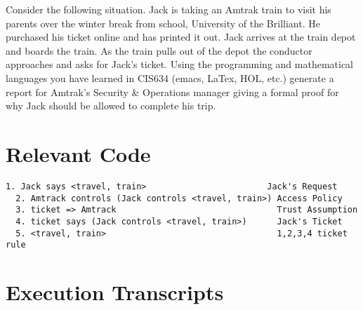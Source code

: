 \documentclass{report}
\begin{document}
Consider the following situation. Jack is taking an Amtrak train to visit his parents over the
winter break from school, University of the Brilliant. He purchased his ticket online and has
printed it out.
Jack arrives at the train depot and boards the train. As the train pulls out of the depot the
conductor approaches and asks for Jack’s ticket. Using the programming and mathematical
languages you have learned in CIS634 (emacs, LaTex, HOL, etc.) generate a report for Amtrak’s
Security \& Operations manager giving a formal proof for why Jack should be allowed to
complete his trip.

\section{Relevant Code}
\label{sec:relevant-code-1}

\lstset{frameround=tttt}
\begin{lstlisting}[frame=tRBL]
  1. Jack says <travel, train>                        Jack's Request  
  2. Amtrack controls (Jack controls <travel, train>) Access Policy  
  3. ticket => Amtrack                                Trust Assumption  
  4. ticket says (Jack controls <travel, train>)      Jack's Ticket  
  5. <travel, train>                                  1,2,3,4 ticket rule  
\end{lstlisting}



\section{Execution Transcripts}
\label{sec:exec-transcr-1}
\end{document}
